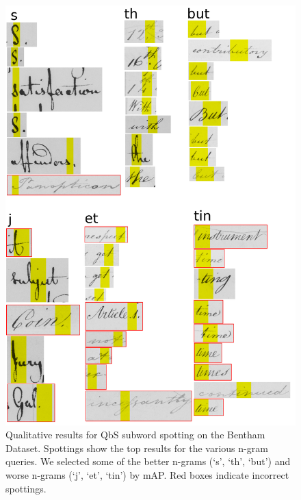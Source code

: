 \documentclass[ms,electronic,twosidetoc,letterpaper,chaptercenter,parttop,lof,lot]{byumsphd}
\begin{document}
\begin{figure}
    \centering
    \includegraphics[width=.75\textwidth]{qualSpot}
    \caption{Qualitative results for QbS subword spotting on the Bentham Dataset. Spottings show the top results for the various n-gram queries. We selected some of the better n-grams (`s', `th', `but') and worse n-grams (`j', `et', `tin') by mAP. Red boxes indicate incorrect spottings.
    }
    \label{fig:qualSpot}
\end{figure}
\end{document}

